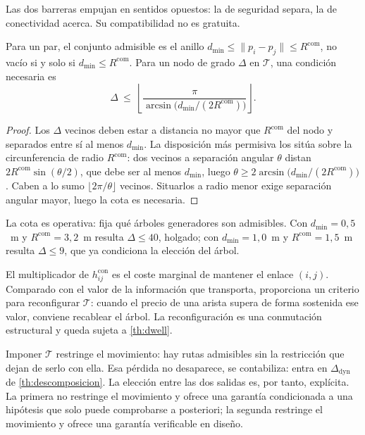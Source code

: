 Las dos barreras empujan en sentidos opuestos: la de seguridad separa, la de
conectividad acerca. Su compatibilidad no es gratuita.

\begin{proposicion}
\label{pr:compatibilidad}
Para un par, el conjunto admisible es el anillo
$d_{\min}\le\|p_i-p_j\|\le R^{\mathrm{com}}$, no vacío si y solo si
$d_{\min}\le R^{\mathrm{com}}$. Para un nodo de grado $\Delta$ en $\mathcal T$,
una condición necesaria es
\[
  \Delta\ \le\
  \left\lfloor
    \frac{\pi}{\arcsin\!\bigl(d_{\min}/(2R^{\mathrm{com}})\bigr)}
  \right\rfloor .
\]
\end{proposicion}

\begin{proof}
Los $\Delta$ vecinos deben estar a distancia no mayor que $R^{\mathrm{com}}$ del
nodo y separados entre sí al menos $d_{\min}$. La disposición más permisiva los
sitúa sobre la circunferencia de radio $R^{\mathrm{com}}$: dos vecinos a
separación angular $\theta$ distan $2R^{\mathrm{com}}\sin(\theta/2)$, que debe
ser al menos $d_{\min}$, luego
$\theta\ge2\arcsin\bigl(d_{\min}/(2R^{\mathrm{com}})\bigr)$. Caben a lo sumo
$\lfloor 2\pi/\theta\rfloor$ vecinos. Situarlos a radio menor exige separación
angular mayor, luego la cota es necesaria.
\end{proof}

La cota es operativa: fija qué árboles generadores son admisibles. Con
$d_{\min}=0{,}5$~m y $R^{\mathrm{com}}=3{,}2$~m resulta $\Delta\le40$, holgado;
con $d_{\min}=1{,}0$~m y $R^{\mathrm{com}}=1{,}5$~m resulta $\Delta\le9$, que ya
condiciona la elección del árbol.

\begin{corolario}
\label{co:precio-conectividad}
El multiplicador de $h^{\mathrm{con}}_{ij}$ es el coste marginal de mantener el
enlace $(i,j)$. Comparado con el valor de la información que transporta,
proporciona un criterio para reconfigurar $\mathcal T$: cuando el precio de una
arista supera de forma sostenida ese valor, conviene recablear el árbol. La
reconfiguración es una conmutación estructural y queda sujeta a
\cref{th:dwell}.
\end{corolario}

\begin{observacion}
\label{obs:coste-conectividad}
Imponer $\mathcal T$ restringe el movimiento: hay rutas admisibles sin la
restricción que dejan de serlo con ella. Esa pérdida no desaparece, se
contabiliza: entra en $\Delta_{\mathrm{dyn}}$ de \cref{th:descomposicion}. La
elección entre las dos salidas es, por tanto, explícita. La primera no restringe
el movimiento y ofrece una garantía condicionada a una hipótesis que solo puede
comprobarse a posteriori; la segunda restringe el movimiento y ofrece una
garantía verificable en diseño.
\end{observacion}

